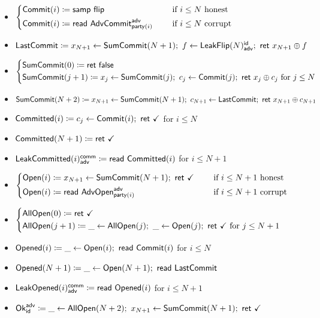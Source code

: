 \begin{itemize}
\item {\color{blue} $\begin{cases*} \Commit(i) \coloneqq \samp{\flip} & \hspace{10pt} \text{if $i \leq N$ honest} \\ \Commit(i) \coloneqq \read{\AdvCommit^\adv_{\party(i)}} & \hspace{10pt} \text{if $i \leq N$ corrupt} \end{cases*}$}
\item {\color{blue} $\LastCommit \coloneqq x_{N+1} \leftarrow \SumCommit(N+1); \ f \leftarrow \LeakFlip(N)^\id_\adv; \ \ret{x_{N+1} \oplus f}$}
\item {\color{blue} $\begin{cases*} \SumCommit(0) \coloneqq \ret{\false} \\ \SumCommit(j+1) \coloneqq x_j \leftarrow \SumCommit(j); \ c_j \leftarrow \Commit(j); \ \ret{x_j \oplus c_j} \text{ for $j \leq N$} \end{cases*}$}
\item {\color{blue} $\SumCommit(N+2) \coloneqq x_{N+1} \leftarrow \SumCommit(N+1); \ c_{N+1} \leftarrow \LastCommit; \ \ret{x_{N+1} \oplus c_{N+1}}$}
\item {\color{magenta} $\mathsf{Committed}(i) \coloneqq c_j \leftarrow \mathsf{Commit}(i); \ \mathsf{ret} \ \checkmark$ for $i \leq N$}
\item {\color{magenta} $\mathsf{Committed}(N+1) \coloneqq \mathsf{ret} \ \checkmark$}
\item {\color{magenta} $\mathsf{LeakCommitted}(i)^{\mathsf{comm}}_{\mathsf{adv}} \coloneqq \mathsf{read} \ \mathsf{Committed}(i)$ for $i \leq N+1$}
\item {\color{teal} $\begin{cases*} \Open(i) \coloneqq x_{N+1} \leftarrow \SumCommit(N+1); \ \ret{\checkmark} & \hspace{10pt} \text{if $i \leq N+1$ honest} \\ \Open(i) \coloneqq \read{\AdvOpen^\adv_{\party(i)}} & \hspace{10pt} \text{if $i \leq N+1$ corrupt} \end{cases*}$}
\item {\color{teal} $\begin{cases*} \AllOpen(0) \coloneqq \ret{\checkmark} \\ \AllOpen(j+1) \coloneqq \_ \leftarrow \AllOpen(j); \ \_ \leftarrow \Open(j); \ \ret{\checkmark} \text{ for $j \leq N+1$} \end{cases*}$}
\item {\color{red} $\mathsf{Opened}(i) \coloneqq \_ \leftarrow \mathsf{Open}(i); \ \mathsf{read} \ \mathsf{Commit}(i)$ for $i \leq N$}
\item {\color{red} $\mathsf{Opened}(N+1) \coloneqq \_ \leftarrow \mathsf{Open}(N+1); \ \mathsf{read} \ \mathsf{LastCommit}$}
\item {\color{red} $\mathsf{LeakOpened}(i)^{\mathsf{comm}}_{\mathsf{adv}} \coloneqq \mathsf{read} \ \mathsf{Opened}(i)$ for $i \leq N+1$}
\item $\Ok^\adv_\id \coloneqq \_ \leftarrow \AllOpen(N+2); \ x_{N+1} \leftarrow \SumCommit(N+1); \ \ret{\checkmark}$
\end{itemize}
